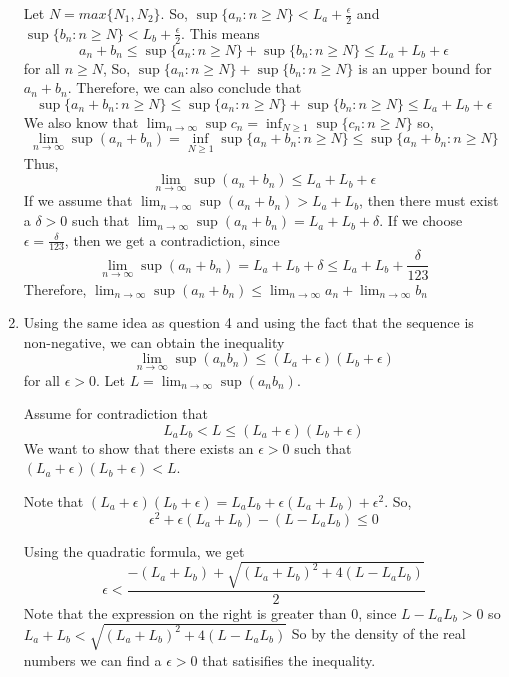 \documentclass[12pt]{article}
\begin{document}
\begin{enumerate}[start=1,label={\bfseries Problem \arabic*:},leftmargin=1in]
    Let $N = max\{N_{1}, N_{2}\}$. 
    So, $\sup \{ a_{n} : n \geq N \} < L_{a} + \frac{\epsilon}{2}$ and $\sup \{ b_{n} : n \geq N \} < L_{b} + \frac{\epsilon}{2}$. 
    This means
    \[
        a_{n} + b_{n} \leq \sup \{a_{n}: n \geq N \} + \sup  \{ b_{n}: n \geq N \} \leq L_{a} + L_{b} + \epsilon 
    \]
    for all $n \geq N$, So, $\sup \{a_{n}: n \geq N \} + \sup  \{ b_{n}: n \geq N \}$ is an upper bound for $a_{n} + b_{n}$. Therefore, we can also conclude that 
    \[
        \sup \{ a_{n} + b_{n} : n \geq N \} \leq \sup \{a_{n} : n \geq N \} + \sup \{b_{n} : n \geq N\} \leq L_{a} + L_{b} + \epsilon
    \]
    We also know that $\lim_{n \to \infty} \sup c_{n} = \inf_{N \geq 1} \sup \{c_{n} : n \geq N\}$
    so, \[\lim_{n \to \infty} \sup (a_{n} + b_{n})  = \inf_{N \geq 1} \sup \{a_{n} + b_{n} : n \geq N\} \leq  \sup \{ a_{n} + b_{n} : n \geq N \}\]
    Thus, 
    \[
        \lim_{n \to \infty} \sup (a_{n} + b_{n}) \leq L_{a} + L_{b} + \epsilon
    \]
    If we assume that $\lim_{n \to \infty} \sup (a_{n} + b_{n}) > L_{a} + L_{b}$, then there must exist a $\delta > 0$ such that 
    $\lim_{n \to \infty} \sup (a_{n} + b_{n}) = L_{a} + L_{b} + \delta$. If we choose $\epsilon = \frac{\delta}{123}$, then we get a contradiction, since 
    \[
        \lim_{n \to \infty} \sup (a_{n} + b_{n}) = L_{a} + L_{b} + \delta \leq L_{a} + L_{b} + \frac{\delta}{123}
    \]
    Therefore, $\lim_{n \to \infty} \sup (a_{n} + b_{n}) \leq \lim_{n \to \infty} a_{n} + \lim_{n \to \infty} b_{n}$

    \item Using the same idea as question 4 and using the fact that the sequence is non-negative, we can obtain the inequality 
    \[
        \lim_{n \to \infty} \sup (a_{n}b_{n}) \leq (L_{a} + \epsilon)(L_{b} + \epsilon)
    \]
    for all $\epsilon > 0$. Let $L =  \lim_{n \to \infty} \sup (a_{n}b_{n})$. 

    Assume for contradiction that 
    \[
        L_{a}L_{b} < L \leq (L_{a} + \epsilon)(L_{b} + \epsilon)    
    \]
    We want to show that there exists an $\epsilon > 0$ such that $(L_{a} + \epsilon)(L_{b} + \epsilon) < L$. 

    Note that $(L_{a} + \epsilon)(L_{b} + \epsilon) = L_{a}L_{b} + \epsilon(L_{a} + L_{b}) + \epsilon^{2}$. So, 
    \[
        \epsilon^{2} + \epsilon(L_{a} + L_{b}) - (L - L_{a}L_{b}) \leq 0 
    \]
    
    Using the quadratic formula, we get 
    \[
    \epsilon < \frac{-(L_{a} + L_{b}) + \sqrt{(L_{a} + L_{b})^{2} + 4(L-L_{a}L_{b})}}{2}
    \]
    Note that the expression on the right is greater than 0, since $L - L_{a}L_{b} > 0$ so $L_{a} + L_{b} < \sqrt{(L_{a} + L_{b})^{2} + 4(L-L_{a}L_{b})}$
    So by the density of the real numbers we can find a $\epsilon > 0$ that satisifies the inequality. 
    

\end{enumerate}
\end{document}
